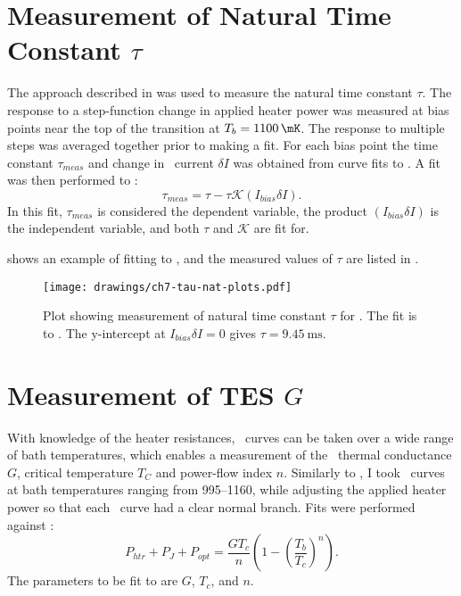 \section{Measurement of Natural Time Constant $\tau$} \label{sec:tau-nat}


The approach described in  was used to measure the natural time constant $\tau$.
The response to a step-function change in applied heater power was measured at bias points near the top of the transition at $T_{b} = \SI{1100}{\mK}$.
The response to multiple steps was averaged together prior to making a fit.
For each bias point the time constant $\tau_{meas}$ and change in \TES\ current $\delta I$ was obtained from curve fits to .
A fit was then performed to :
\begin{equation} \label{eqn:tau-nat-fit}
  \tau_{meas} = \tau - \tau \mathcal{K} (I_{bias} \delta I).
\end{equation}
In this fit, $\tau_{meas}$ is considered the dependent variable, the product $(I_{bias} \delta I)$ is the independent variable, and both $\tau$ and $\mathcal{K}$ are fit for.

 shows an example of fitting to , and the measured values of $\tau$ are listed in .

\begin{figure*}
  \centering
\texttt{[image: drawings/ch7-tau-nat-plots.pdf]}
\caption{
  Plot showing measurement of natural time constant $\tau$ for . The fit is to .
  The y-intercept at $I_{bias} \delta I = 0$ gives $\tau = \SI{9.45}{\ms}$.
} 
\label{fig:tau-nat-plots}
\end{figure*}

\section{Measurement of \textsc{TES} $G$} \label{sec:g-psat}

With knowledge of the heater resistances, \IV\ curves can be taken over a wide range of bath temperatures, which enables a measurement of the \TES\ thermal conductance $G$, critical temperature $T_C$ and power-flow index $n$.
Similarly to , I took \IV\ curves at bath temperatures ranging from \SIrange{995}{1160}{\mK}, while adjusting the applied heater power so that each \IV\ curve had a clear normal branch.
Fits were performed against :
\begin{equation}\label{eqn:g-fit}
P_{htr} + P_J + P_{opt}= \frac{G T_c}{n}\left(1 - \left(\frac{T_b}{T_c}\right)^n\right).
\end{equation}
The parameters to be fit to are $G$, $T_c$, and $n$.

